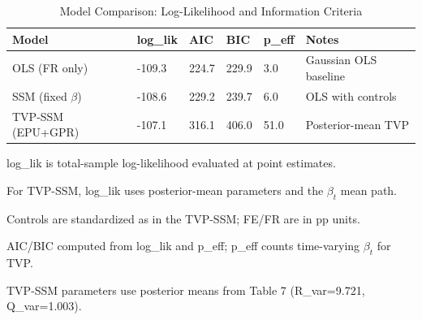 \begin{table}[!htbp]
    \centering
    \small
    \caption{Model Comparison: Log-Likelihood and Information Criteria}
    \label{tab:model_comp}
    \begin{threeparttable}
        \begin{tabular}{@{}llllll@{}}
            \toprule
            Model               & log\_lik & AIC   & BIC   & p\_eff & Notes                 \\
            \midrule
            OLS (FR only)       & -109.3   & 224.7 & 229.9 & 3.0    & Gaussian OLS baseline \\
            SSM (fixed $\beta$) & -108.6   & 229.2 & 239.7 & 6.0    & OLS with controls     \\
            TVP-SSM (EPU+GPR)   & -107.1   & 316.1 & 406.0 & 51.0   & Posterior-mean TVP    \\
            \bottomrule
        \end{tabular}
        \begin{tablenotes}[flushleft]
            \footnotesize
            \item log\_lik is total-sample log-likelihood evaluated at point estimates.
            \item For TVP-SSM, log\_lik uses posterior-mean parameters and the $\beta_t$ mean path.
            \item Controls are standardized as in the TVP-SSM; FE/FR are in pp units.
            \item AIC/BIC computed from log\_lik and p\_eff; p\_eff counts time-varying $\beta_t$ for TVP.
            \item TVP-SSM parameters use posterior means from Table 7 (R\_var=9.721, Q\_var=1.003).
        \end{tablenotes}
    \end{threeparttable}
\end{table}
